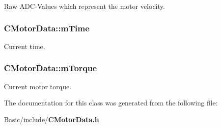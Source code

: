 Raw A\-D\-C-\/\-Values which represent the motor velocity. 

\subsubsection[{m\-Time}]{ C\-Motor\-Data\-::m\-Time\hspace{0.3cm}{\ttfamily [private]}}\label{classCMotorData_ad81474626f24208bdc12b23f1a1c9acf}


Current time. 

\subsubsection[{m\-Torque}]{ C\-Motor\-Data\-::m\-Torque\hspace{0.3cm}{\ttfamily [private]}}\label{classCMotorData_aec15090a13905a6dbc0930b43bcf6543}


Current motor torque. 



The documentation for this class was generated from the following file\-:\begin{DoxyCompactItemize}
\item 
Basic/include/{\bf C\-Motor\-Data.\-h}\end{DoxyCompactItemize}
